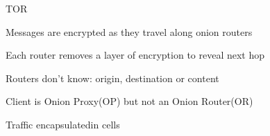 \documentclass[main.tex]{subfiles}
\begin{document}
\begin{card}{TOR}
\item Messages are encrypted as they travel along onion routers
\item Each router removes a layer of encryption to reveal next hop
\item Routers don't know: origin, destination or content
\item Client is Onion Proxy(OP) but not an Onion Router(OR)
\item Traffic encapsulatedin cells
\end{card}
\end{document}
